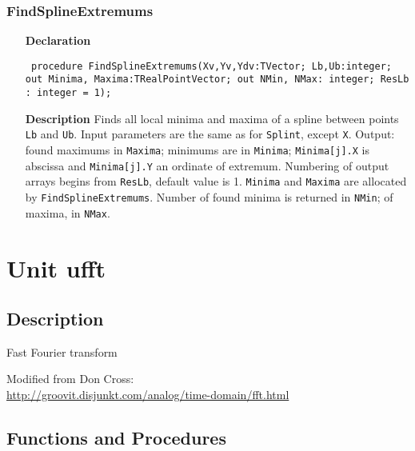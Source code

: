 \documentclass[12pt,a4paper,oneside]{report}
\newcommand{\declarationitem}[1]{\textbf{#1}}
\newcommand{\descriptiontitle}[1]{\textbf{#1}}
\newcommand{\code}[1]{\texttt{#1}}
\begin{document}
\subsubsection{FindSplineExtremums}
\label{uSpline-FindSplineExtremums}
\begin{itemize}\item[\declarationitem{Declaration}\hfill]
	\begin{flushleft}
		\code{
			procedure FindSplineExtremums(Xv,Yv,Ydv:TVector; Lb,Ub:integer; out Minima, Maxima:TRealPointVector; out NMin, NMax: integer; ResLb : integer = 1);}
		
	\end{flushleft}
	
	\par
	\item[\descriptiontitle{Description}]
	Finds all local minima and maxima of a spline between points \code{Lb} and \code{Ub}. Input parameters are the same as for \code{Splint}, except \code{X}. Output: found maximums in \code{Maxima}; minimums are in \code{Minima}; \code{Minima[j].X} is abscissa and \code{Minima[j].Y} an ordinate of extremum. Numbering of output arrays begins from \code{ResLb}, default value is 1. \code{Minima} and \code{Maxima} are allocated by \code{FindSplineExtremums}. Number of found minima is returned in \code{NMin}; of maxima, in \code{NMax}.
	
\end{itemize}

\section{Unit ufft}
\label{ufft}
\subsection{Description}
Fast Fourier transform 

Modified from Don Cross:\\ \href{http://groovit.disjunkt.com/analog/time-domain/fft.html}{http://groovit.disjunkt.com/analog/time-domain/fft.html}

\subsection{Functions and Procedures}
\end{document}
